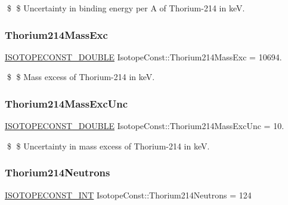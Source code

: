 \$ \$ Uncertainty in binding energy per A of Thorium-\/214 in keV. \mbox{\label{group___isotope_const-_thorium-_th214_ga23090120f5c4ca4efc0c1ef6fd5ba020}} 
\subsubsection{\texorpdfstring{Thorium214\+Mass\+Exc}{Thorium214MassExc}}
{\footnotesize\ttfamily \mbox{\hyperlink{group___isotope_const-_macros_ga8f45a7272ce02c0b4c65c44636ed719a}{I\+S\+O\+T\+O\+P\+E\+C\+O\+N\+S\+T\+\_\+\+D\+O\+U\+B\+LE}} Isotope\+Const\+::\+Thorium214\+Mass\+Exc = 10694.}

\$ \$ Mass excess of Thorium-\/214 in keV. \mbox{\label{group___isotope_const-_thorium-_th214_ga5adc131a24df56d076c0ca56a68d813e}} 
\subsubsection{\texorpdfstring{Thorium214\+Mass\+Exc\+Unc}{Thorium214MassExcUnc}}
{\footnotesize\ttfamily \mbox{\hyperlink{group___isotope_const-_macros_ga8f45a7272ce02c0b4c65c44636ed719a}{I\+S\+O\+T\+O\+P\+E\+C\+O\+N\+S\+T\+\_\+\+D\+O\+U\+B\+LE}} Isotope\+Const\+::\+Thorium214\+Mass\+Exc\+Unc = 10.}

\$ \$ Uncertainty in mass excess of Thorium-\/214 in keV. \mbox{\label{group___isotope_const-_thorium-_th214_gad43fbb556c440e61bd8eada6db30f6b2}} 
\subsubsection{\texorpdfstring{Thorium214\+Neutrons}{Thorium214Neutrons}}
{\footnotesize\ttfamily \mbox{\hyperlink{group___isotope_const-_macros_ga5f18360b3e99483a35c32d789e62621c}{I\+S\+O\+T\+O\+P\+E\+C\+O\+N\+S\+T\+\_\+\+I\+NT}} Isotope\+Const\+::\+Thorium214\+Neutrons = 124}

